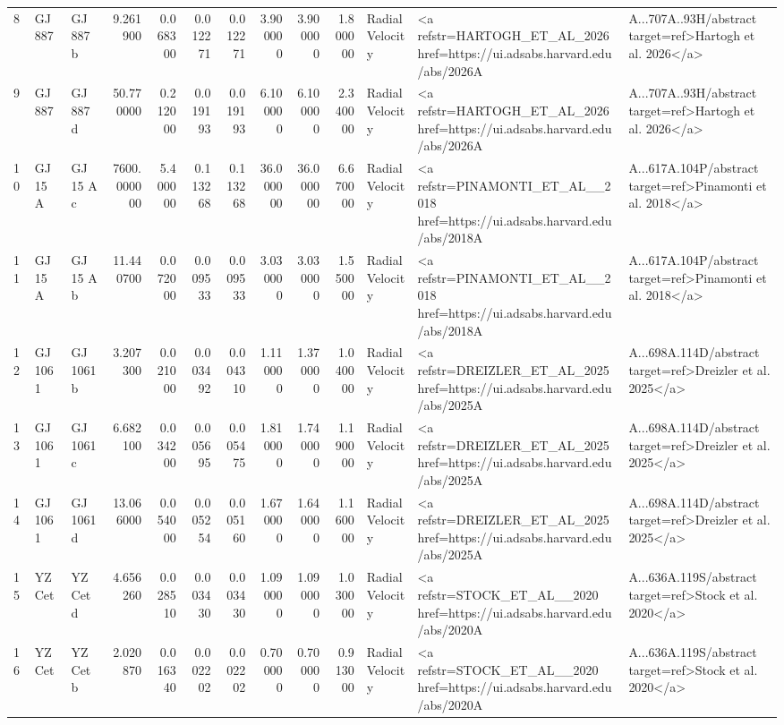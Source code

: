 \begin{tabular}{lllrrrrrrrll}
8 & GJ 887 & GJ 887 b & 9.261900 & 0.068300 & 0.012271 & 0.012271 & 3.900000 & 3.900000 & 1.800000 & Radial Velocity & <a refstr=HARTOGH_ET_AL_2026 href=https://ui.adsabs.harvard.edu/abs/2026A&A...707A..93H/abstract target=ref>Hartogh et al. 2026</a> \\
9 & GJ 887 & GJ 887 d & 50.770000 & 0.212000 & 0.019193 & 0.019193 & 6.100000 & 6.100000 & 2.340000 & Radial Velocity & <a refstr=HARTOGH_ET_AL_2026 href=https://ui.adsabs.harvard.edu/abs/2026A&A...707A..93H/abstract target=ref>Hartogh et al. 2026</a> \\
10 & GJ 15 A & GJ 15 A c & 7600.000000 & 5.400000 & 0.113268 & 0.113268 & 36.000000 & 36.000000 & 6.670000 & Radial Velocity & <a refstr=PINAMONTI_ET_AL__2018 href=https://ui.adsabs.harvard.edu/abs/2018A&A...617A.104P/abstract target=ref>Pinamonti et al. 2018</a> \\
11 & GJ 15 A & GJ 15 A b & 11.440700 & 0.072000 & 0.009533 & 0.009533 & 3.030000 & 3.030000 & 1.550000 & Radial Velocity & <a refstr=PINAMONTI_ET_AL__2018 href=https://ui.adsabs.harvard.edu/abs/2018A&A...617A.104P/abstract target=ref>Pinamonti et al. 2018</a> \\
12 & GJ 1061 & GJ 1061 b & 3.207300 & 0.021000 & 0.003492 & 0.004310 & 1.110000 & 1.370000 & 1.040000 & Radial Velocity & <a refstr=DREIZLER_ET_AL_2025 href=https://ui.adsabs.harvard.edu/abs/2025A&A...698A.114D/abstract target=ref>Dreizler et al. 2025</a> \\
13 & GJ 1061 & GJ 1061 c & 6.682100 & 0.034200 & 0.005695 & 0.005475 & 1.810000 & 1.740000 & 1.190000 & Radial Velocity & <a refstr=DREIZLER_ET_AL_2025 href=https://ui.adsabs.harvard.edu/abs/2025A&A...698A.114D/abstract target=ref>Dreizler et al. 2025</a> \\
14 & GJ 1061 & GJ 1061 d & 13.066000 & 0.054000 & 0.005254 & 0.005160 & 1.670000 & 1.640000 & 1.160000 & Radial Velocity & <a refstr=DREIZLER_ET_AL_2025 href=https://ui.adsabs.harvard.edu/abs/2025A&A...698A.114D/abstract target=ref>Dreizler et al. 2025</a> \\
15 & YZ Cet & YZ Cet d & 4.656260 & 0.028510 & 0.003430 & 0.003430 & 1.090000 & 1.090000 & 1.030000 & Radial Velocity & <a refstr=STOCK_ET_AL__2020 href=https://ui.adsabs.harvard.edu/abs/2020A&A...636A.119S/abstract target=ref>Stock et al. 2020</a> \\
16 & YZ Cet & YZ Cet b & 2.020870 & 0.016340 & 0.002202 & 0.002202 & 0.700000 & 0.700000 & 0.913000 & Radial Velocity & <a refstr=STOCK_ET_AL__2020 href=https://ui.adsabs.harvard.edu/abs/2020A&A...636A.119S/abstract target=ref>Stock et al. 2020</a> \\

\end{tabular}
